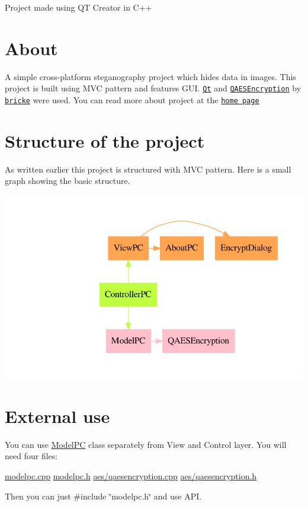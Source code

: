 Project made using QT Creator in C++\hypertarget{index_about}{}\section{About}\label{index_about}
A simple cross-\/platform steganography project which hides data in images. This project is built using M\+VC pattern and features G\+UI. \href{https://qt.io}{\tt Qt} and \href{https://github.com/bricke/Qt-AES}{\tt Q\+A\+E\+S\+Encryption} by \href{https://github.com/bricke}{\tt bricke} were used. You can read more about project at the \href{../}{\tt home page}\hypertarget{index_structure}{}\section{Structure of the project}\label{index_structure}
As written earlier this project is structured with M\+VC pattern. Here is a small graph showing the basic structure. 
\begin{DoxyImageNoCaption}
  \mbox{\includegraphics[width=\textwidth,height=\textheight/2,keepaspectratio=true]{dot_structure}}
\end{DoxyImageNoCaption}
\hypertarget{index_ext-use}{}\section{External use}\label{index_ext-use}
You can use \hyperlink{class_model_p_c}{Model\+PC} class separately from View and Control layer. You will need four files\+:

\hyperlink{modelpc_8cpp}{modelpc.\+cpp} \hyperlink{modelpc_8h}{modelpc.\+h} \hyperlink{qaesencryption_8cpp}{aes/qaesencryption.\+cpp} \hyperlink{qaesencryption_8h}{aes/qaesencryption.\+h}

Then you can just {\ttfamily \#include \char`\"{}modelpc.\+h\char`\"{}} and use A\+PI.
